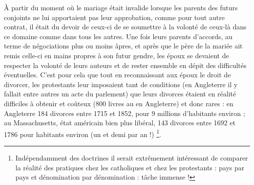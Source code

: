  À partir du moment où le mariage était invalide lorsque les parents des futurs conjoints ne lui apportaient pas leur approbation, comme pour tout autre contrat, il était du devoir de ceux-ci de se soumettre à la volonté de ceux-là dans ce domaine comme dans tous les autres. Une fois leurs parents d'accords, au terme de négociations plus ou moins âpres, et après que le père de la mariée ait remis celle-ci en mains propres à son futur gendre, les époux se devaient de respecter la volonté de leurs auteurs et de rester ensemble en dépit des difficultés éventuelles. C'est pour cela que tout en reconnaissant aux époux le droit de divorcer, les protestants leur imposaient tant de conditions (en Angleterre il y fallait entre autres un acte du parlement) que leurs divorces étaient en réalité difficiles à obtenir et coûteux (800 livres au  en Angleterre) et donc rares : en Angleterre 184 divorces entre 1715 et 1852, pour 9 millions d'habitants environ ; au Massachusetts, état américain bien plus libéral, 143 divorces entre 1692 et 1786 pour  habitants environ (un et demi par an !) 
 \footnote{Indépendamment des doctrines il serait extrêmement intéressant de comparer la réalité des pratiques chez les catholiques et chez les protestants : pays par pays et dénomination par dénomination : tâche immense !}. 


 